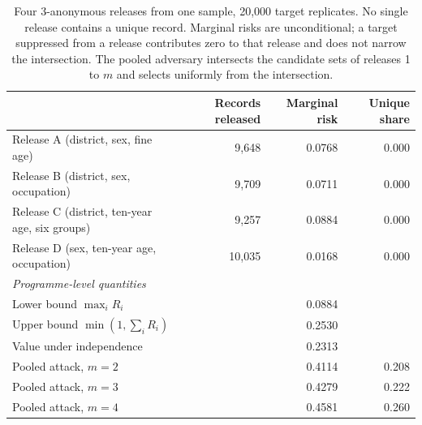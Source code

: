 \begin{table}[t]
\centering
\caption{Four 3-anonymous releases from one sample, 20{,}000 target replicates. No single release contains a unique record. Marginal risks are unconditional; a target suppressed from a release contributes zero to that release and does not narrow the intersection. The pooled adversary intersects the candidate sets of releases 1 to $m$ and selects uniformly from the intersection.}
\label{tab:comp}
\begin{tabular}{lrrr}
\toprule
& Records released & Marginal risk & Unique share \\
\midrule
Release A (district, sex, fine age) & 9{,}648 & 0.0768 & 0.000 \\
Release B (district, sex, occupation) & 9{,}709 & 0.0711 & 0.000 \\
Release C (district, ten-year age, six groups) & 9{,}257 & 0.0884 & 0.000 \\
Release D (sex, ten-year age, occupation) & 10{,}035 & 0.0168 & 0.000 \\
\midrule
\multicolumn{4}{l}{\emph{Programme-level quantities}} \\
Lower bound $\max_i R_i$ & & 0.0884 & \\
Upper bound $\min(1, \sum_i R_i)$ & & 0.2530 & \\
Value under independence & & 0.2313 & \\
Pooled attack, $m = 2$ & & 0.4114 & 0.208 \\
Pooled attack, $m = 3$ & & 0.4279 & 0.222 \\
Pooled attack, $m = 4$ & & 0.4581 & 0.260 \\
\bottomrule
\end{tabular}
\end{table}
